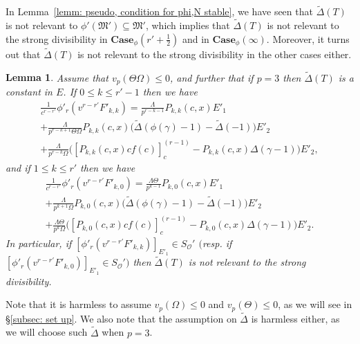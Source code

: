 \documentclass[11pt]{amsart}
\theoremstyle{definition}
\numberwithin{equation}{subsection}
\theoremstyle{plain}
\theoremstyle{plain}
\theoremstyle{plain}
\theoremstyle{plain}
\theoremstyle{plain}
\theoremstyle{plain}
\theoremstyle{plain}
\theoremstyle{plain}
\theoremstyle{plain}
\newtheorem{lemm}[equation]{Lemma}
\theoremstyle{plain}
\theoremstyle{plain}
\theoremstyle{plain}
\theoremstyle{definition}
\theoremstyle{definition}
\theoremstyle{definition}
\theoremstyle{remark}
\renewcommand{\(}{\textup{(}}
\renewcommand{\)}{\textup{)}}
\newcommand{\fM}{\mathfrak{M}}
\newcommand{\cO}{\mathcal{O}}
\begin{document}
In Lemma~\ref{lemm: pseudo, condition for phi,N stable}, we have seen that $\tilde{\Delta}(T)$ is not relevant to $\phi'(\fM')\subseteq \fM'$, which implies that $\tilde{\Delta}(T)$ is not relevant to the strong divisibility in $\mathbf{Case}_\phi(r'+\tfrac{1}{2})$ and in $\mathbf{Case}_\phi(\infty)$. Moreover, it turns out that $\tilde{\Delta}(T)$ is not relevant to the strong divisibility in the other cases either.
\begin{lemm}\label{lemma formula for phi_r(F_kk) and phi_r(F_k0)}
Assume that $v_p(\Theta\Omega)\leq 0$, and further that if $p=3$ then $\tilde{\Delta}(T)$ is a constant in $E$. If $0\leq k\leq r'-1$ then we have
\begin{multline}\label{eq: formula for phi_r(F_k,k)}
\frac{1}{c^{r-r'}}\phi'_r(v^{r-r'}F'_{k,k})=\frac{\Lambda }{p^{r-k-1}}P_{k,k}(c,x)E'_1\\ 
+\frac{\Lambda}{p^{r-k+1}\Theta\Omega}P_{k,k}(c,x)\big(
    \tilde\Delta(\phi(\gamma)-1)-\tilde\Delta(-1)
    \big)E'_2 \\
    +\frac{\Lambda}{p^{r-k}\Omega}\big([P_{k,k}(c,x)cf(c)]_c^{(r-1)}-P_{k,k}(c,x)\Delta(\gamma-1)\big)E'_2,
\end{multline}
and if $1\leq k\leq r'$ then we have
\begin{multline}\label{eq: formula for phi_r(F_k,0)}
\frac{1}{c^{r-r'}}\phi'_r(v^{r-r'}F'_{k,0})=\frac{ \Lambda \Theta}{p^{k-1}}P_{k,0}(c,x)E'_1\\ 
+\frac{\Lambda}{p^{k+1}\Omega}P_{k,0}(c,x)\big(
    \tilde\Delta(\phi(\gamma)-1)-\tilde\Delta(-1) \big)E'_2 \\
    +\frac{\Lambda\Theta}{p^k\Omega} \big([P_{k,0}(c,x)cf(c)]_c^{(r-1)}-P_{k,0}(c,x)\Delta(\gamma-1)\big)E'_2.
\end{multline}
In particular, if $[\phi'_r(v^{r-r'}F'_{k,k})]_{E'_1}\in S_\cO'$ $($resp. if $[\phi'_r(v^{r-r'}F'_{k,0})]_{E'_1}\in S_\cO')$ then $\tilde{\Delta}(T)$ is not relevant to the strong divisibility.
\end{lemm}

Note that it is harmless to assume $v_p(\Omega)\leq 0$ and $v_p(\Theta)\leq0$, as we will see in \S\ref{subsec: set up}. We also note that the assumption on $\tilde{\Delta}$ is harmless either, as we will choose such $\tilde{\Delta}$ when $p=3$.
\end{document}

